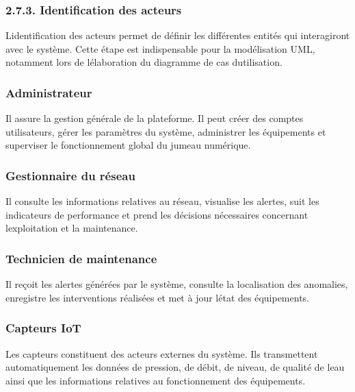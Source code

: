 \documentclass[12pt,a4paper,oneside]{report}
\begin{document}
\subsubsection{2.7.3. Identification des
acteurs}\label{identification-des-acteurs}

L\textquotesingle identification des acteurs permet de définir les
différentes entités qui interagiront avec le système. Cette étape est
indispensable pour la modélisation UML, notamment lors de
l\textquotesingle élaboration du diagramme de cas
d\textquotesingle utilisation.

\subsubsection{\texorpdfstring{
Administrateur}{ Administrateur}}\label{administrateur}

Il assure la gestion générale de la plateforme. Il peut créer des
comptes utilisateurs, gérer les paramètres du système, administrer les
équipements et superviser le fonctionnement global du jumeau numérique.

\subsubsection{Gestionnaire du réseau}\label{gestionnaire-du-ruxe9seau}

Il consulte les informations relatives au réseau, visualise les alertes,
suit les indicateurs de performance et prend les décisions nécessaires
concernant l\textquotesingle exploitation et la maintenance.

\subsubsection{Technicien de
maintenance}\label{technicien-de-maintenance}

Il reçoit les alertes générées par le système, consulte la localisation
des anomalies, enregistre les interventions réalisées et met à jour
l\textquotesingle état des équipements.

\subsubsection{Capteurs IoT}\label{capteurs-iot}

Les capteurs constituent des acteurs externes du système. Ils
transmettent automatiquement les données de pression, de débit, de
niveau, de qualité de l\textquotesingle eau ainsi que les informations
relatives au fonctionnement des équipements.
\end{document}
